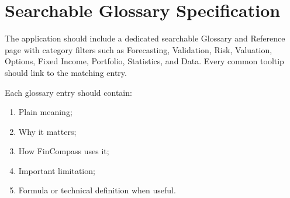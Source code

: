 \documentclass[11pt]{article}
\begin{document}
\section{Searchable Glossary Specification}
The application should include a dedicated searchable Glossary and Reference page with category filters such as Forecasting, Validation, Risk, Valuation, Options, Fixed Income, Portfolio, Statistics, and Data. Every common tooltip should link to the matching entry.

Each glossary entry should contain:
\begin{enumerate}[itemsep=0.15em]
\item Plain meaning;
\item Why it matters;
\item How FinCompass uses it;
\item Important limitation;
\item Formula or technical definition when useful.
\end{enumerate}
\end{document}
